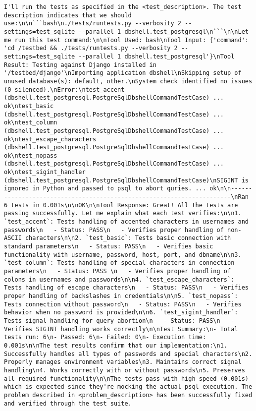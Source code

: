 \begin{lstlisting}
I'll run the tests as specified in the <test_description>. The test description indicates that we should use:\n\n```bash\n./tests/runtests.py --verbosity 2 --settings=test_sqlite --parallel 1 dbshell.test_postgresql\n```\n\nLet me run this test command:\n\nTool Used: bash\nTool Input: {'command': 'cd /testbed && ./tests/runtests.py --verbosity 2 --settings=test_sqlite --parallel 1 dbshell.test_postgresql'}\nTool Result: Testing against Django installed in '/testbed/django'\nImporting application dbshell\nSkipping setup of unused database(s): default, other.\nSystem check identified no issues (0 silenced).\nError:\ntest_accent (dbshell.test_postgresql.PostgreSqlDbshellCommandTestCase) ... ok\ntest_basic (dbshell.test_postgresql.PostgreSqlDbshellCommandTestCase) ... ok\ntest_column (dbshell.test_postgresql.PostgreSqlDbshellCommandTestCase) ... ok\ntest_escape_characters (dbshell.test_postgresql.PostgreSqlDbshellCommandTestCase) ... ok\ntest_nopass (dbshell.test_postgresql.PostgreSqlDbshellCommandTestCase) ... ok\ntest_sigint_handler (dbshell.test_postgresql.PostgreSqlDbshellCommandTestCase)\nSIGINT is ignored in Python and passed to psql to abort quries. ... ok\n\n----------------------------------------------------------------------\nRan 6 tests in 0.001s\n\nOK\n\nTool Response: Great! All the tests are passing successfully. Let me explain what each test verifies:\n\n1. `test_accent`: Tests handling of accented characters in usernames and passwords\n   - Status: PASS\n   - Verifies proper handling of non-ASCII characters\n\n2. `test_basic`: Tests basic connection with standard parameters\n   - Status: PASS\n   - Verifies basic functionality with username, password, host, port, and dbname\n\n3. `test_column`: Tests handling of special characters in connection parameters\n   - Status: PASS \n   - Verifies proper handling of colons in usernames and passwords\n\n4. `test_escape_characters`: Tests handling of escape characters\n   - Status: PASS\n   - Verifies proper handling of backslashes in credentials\n\n5. `test_nopass`: Tests connection without password\n   - Status: PASS\n   - Verifies behavior when no password is provided\n\n6. `test_sigint_handler`: Tests signal handling for query abortion\n   - Status: PASS\n   - Verifies SIGINT handling works correctly\n\nTest Summary:\n- Total tests run: 6\n- Passed: 6\n- Failed: 0\n- Execution time: 0.001s\n\nThe test results confirm that our implementation:\n1. Successfully handles all types of passwords and special characters\n2. Properly manages environment variables\n3. Maintains correct signal handling\n4. Works correctly with or without passwords\n5. Preserves all required functionality\n\nThe tests pass with high speed (0.001s) which is expected since they're mocking the actual psql execution. The problem described in <problem_description> has been successfully fixed and verified through the test suite.
\end{lstlisting}
